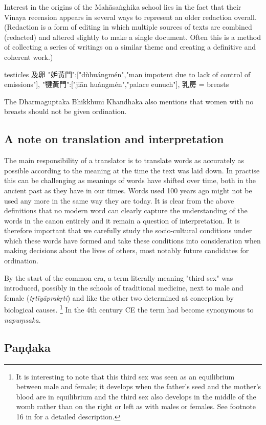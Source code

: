 
Interest in the origins of the Mahāsaṅghika school lies in the fact that their Vinaya recension appears in several ways to represent an older redaction overall. (Redaction is a form of editing in which multiple sources of texts are combined (redacted) and altered slightly to make a single document. Often this is a method of collecting a series of writings on a similar theme and creating a definitive and coherent work.)

testicles 及卵
"妒黃門":["dùhuángmén","man impotent due to lack of control of emissions"],
"犍黃門":["jiān huángmén","palace eunuch"],
乳房 = breasts

The Dharmaguptaka Bhikkhunī Khandhaka also mentions that women with no breasts should not be given ordination.

\subsection{A note on translation and interpretation}
The main responsibility of a translator is to translate words as accurately as possible according to the meaning at the time the text was laid down. In practise this can be challenging as meanings of words have shifted over time, both in the ancient past as they have in our times. Words used 100 years ago might not be used any more in the same way they are today. It is clear from the above definitions that no modern word can clearly capture the understanding of the words in the canon entirely and it remain a question of interpretation. It is therefore important that we carefully study the socio-cultural conditions under which these words have formed and take these conditions into consideration when making decisions about the lives of others, most notably future candidates for ordination.


By the start of the common era, a term literally meaning "third sex" was introduced, possibly in the schools of traditional medicine, next to male and female ({\em tṛtīyāprakṛti}) and like the other two determined at conception by biological causes. \footnote{It is interesting to note that this third sex was seen as an equilibrium between male and female; it develops when the father's seed and the mother's blood are in equilibrium and the third sex also develops in the middle of the womb rather than on the right or left as with males or females. See footnote 16 in \cite{zwilling} for a detailed description.} In the 4th century CE the term had become synonymous to {\em napuṃsaka}.


\subsection{Paṇḍaka}

